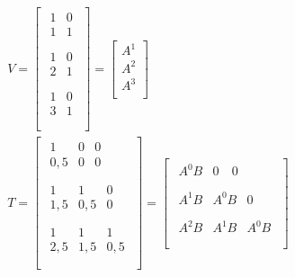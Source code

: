 \begin{equation} \label{eq8}
\begin{split}
V = \begin{bmatrix}
\begin{matrix}
1 & 0 \\
1 & 1 \\
\end{matrix} \\
\begin{matrix}
1 & 0 \\
2 & 1 \\
\end{matrix} \\
\begin{matrix}
1 & 0 \\
3 & 1 \\
\end{matrix} \\
\end{bmatrix} = \begin{bmatrix}
A^{1} \\
A^{2} \\
A^{3} \\
\end{bmatrix} \\
T = \begin{bmatrix}
\begin{matrix}
1 & 0 & 0 \\
0,5 & 0 & 0 \\
\end{matrix} \\
\begin{matrix}
1 & 1 & 0 \\
1,5 & 0,5 & 0 \\
\end{matrix} \\
\begin{matrix}
1 & 1 & 1 \\
2,5 & 1,5 & 0,5 \\
\end{matrix} \\
\end{bmatrix} = \begin{bmatrix}
\begin{matrix}
A^{0}B & 0\  & 0 \\
\end{matrix} \\
\begin{matrix}
A^{1}B & A^{0}B & 0 \\
\end{matrix} \\
\begin{matrix}
A^{2}B & A^{1}B & A^{0}B \\
\end{matrix} \\
\end{bmatrix}
\end{split}
\end{equation}


